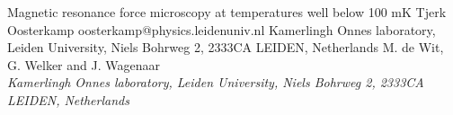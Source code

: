 \begin{conf-abstract}[]
{Magnetic resonance force microscopy at temperatures well below 100 mK}
{\color{blue} Tjerk Oosterkamp}
{oosterkamp@physics.leidenuniv.nl}
{Kamerlingh Onnes laboratory, Leiden University, Niels Bohrweg 2, 2333CA LEIDEN, Netherlands}
{{\color{blue}M. de Wit, G. Welker and J. Wagenaar}\\ \textit{Kamerlingh Onnes laboratory, Leiden University, Niels Bohrweg 2, 2333CA LEIDEN, Netherlands}\\ 
\decofourleft \decofourright}





\printbibliography[heading=none]

\end{conf-abstract}
